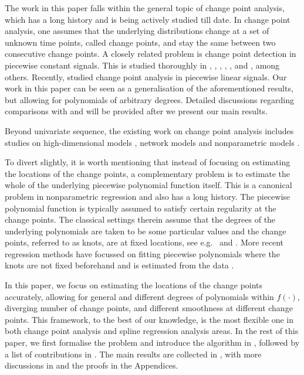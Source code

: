 \documentclass{article}
\begin{document}
The work in this paper falls within the general topic of change point analysis, which has a long history and is being actively studied till date.  In change point analysis, one assumes that the underlying distributions change at a set of unknown time points, called change points, and stay the same between two consecutive change points.  A closely related problem is change point detection in piecewise constant signals.  This is studied thoroughly in \cite{chan2013}, \cite{FrickEtal2014}, \cite{dumbgen2001multiscale}, \cite{dumbgen2008multiscale}, \cite{LiEtal2017}, \cite{jeng2012simultaneous} and \cite{wang2020univariate}, among others.  Recently, \cite{fearnhead2019detecting} studied change point analysis in piecewise linear signals.  Our work in this paper can be seen as a generalisation of the aforementioned results, but allowing for polynomials of arbitrary degrees.  Detailed discussions regarding comparisons with \cite{wang2020univariate} and \cite{fearnhead2018changepoint} will be provided after we present our main results.

Beyond univariate sequence, the existing work on change point analysis includes studies on high-dimensional models \citep[e.g.][]{wang2017optimal, DetteEtal2018, wang2016high}, network models \citep[e.g.][]{wang2018optimal, CribbenYu2017, bhattacharjee2018change} and nonparametric models \citep[e.g.][]{padilla2019optimal, padilla2019optimal2, garreau2018consistent}.    

 To divert slightly, it is worth mentioning that instead of focusing on estimating the locations of the change points, a complementary problem is to estimate the whole of the underlying piecewise polynomial function itself.  This is a canonical problem in nonparametric regression and also has a long history.  The piecewise polynomial function is typically assumed to satisfy certain regularity at the change points.  The classical settings therein assume that the degrees of the underlying polynomials are taken to be some particular values and the change points, referred to as knots, are at fixed locations, see e.g.~\cite{green1993nonparametric} and \cite{wahba1990spline}.  More recent regression methods have focussed on fitting piecewise polynomials where the knots are not fixed beforehand and is estimated from the data \citep[e.g.][]{mammen1997locally, tibshirani2014adaptive, shen2020phase, guntuboyina2020adaptive}.   

In this paper, we focus on estimating the locations of the change points accurately, allowing for general and different degrees of polynomials within $f(\cdot)$, diverging number of change points, and different smoothness at different change points.  This framework, to the best of our knowledge, is the most flexible one in both change point analysis and spline regression analysis areas.  In the rest of this paper, we first formalise the problem and introduce the algorithm in , followed by a list of contributions in .  The main results are collected in , with more discussions in  and the proofs in the Appendices.
\end{document}
